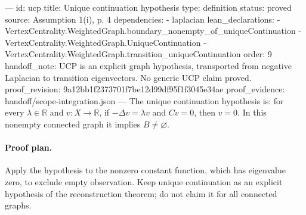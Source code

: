 ---
id: ucp
title: Unique continuation hypothesis
type: definition
status: proved
source: Assumption 1(i), p. 4
dependencies:
- laplacian
lean_declarations:
- VertexCentrality.WeightedGraph.boundary_nonempty_of_uniqueContinuation
- VertexCentrality.WeightedGraph.UniqueContinuation
- VertexCentrality.WeightedGraph.transition_uniqueContinuation
order: 9
handoff_note: UCP is an explicit graph hypothesis, transported from negative Laplacian to transition eigenvectors. No generic UCP claim proved.
proof_revision: 9a12bb1f2373701f7be12d99df95f1f3045e34ae
proof_evidence: handoff/scope-integration.json
---
The unique continuation hypothesis is: for every $\lambda\in\mathbb R$ and $v:X\to\mathbb R$, if $-\Delta v=\lambda v$ and $Cv=0$, then $v=0$. In this nonempty connected graph it implies $B\ne\varnothing$.

\paragraph{Proof plan.}
Apply the hypothesis to the nonzero constant function, which has eigenvalue zero, to exclude empty observation. Keep unique continuation as an explicit hypothesis of the reconstruction theorem; do not claim it for all connected graphs.
